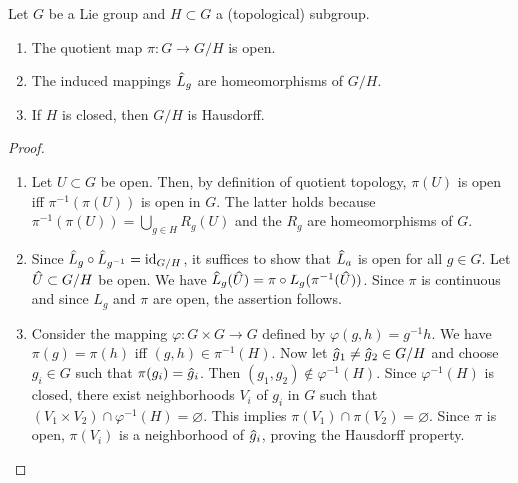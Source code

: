 \begin{lem}[{{\cite[Lem.~5.7.1]{RS1}}}]\label{lem 5.7.1 RS1}
    Let $G$ be a Lie group and $H\subset G$ a (topological) subgroup.
    \begin{enumerate}
        \item The quotient map $\pi:G\to G\slash H$ is open.
        \item The induced mappings $\wh{L}_g$ are homeomorphisms of $G\slash H$.
        \item If $H$ is closed, then $G\slash H$ is Hausdorff.
    \end{enumerate}
\end{lem}
\begin{proof}
    \begin{enumerate}
        \item Let $U\subset G$ be open. Then, by definition of quotient topology, $\pi(U)$ is open iff $\pi^{-1}(\pi(U))$ is open in $G$. The latter holds because $\pi^{-1}(\pi(U))=\bigcup_{g\in H}R_g(U)$ and the $R_g$ are homeomorphisms of $G$.
        \item Since $\wh{L}_g\circ \wh{L}_{g^{-1}}=\id_{G\slash H}$, it suffices to show that $\wh{L}_a$ is open for all $g\in G$. Let $\wh{U}\subset G\slash H$ be open. We have $\wh{L}_g(\wh{U})=\pi\circ L_g(\pi^{-1}(\wh{U}))$. Since $\pi$ is continuous and since $L_g$ and $\pi$ are open, the assertion follows.
        \item Consider the mapping $\varphi:G\times G\to G$  defined by $\varphi(g,h)=g^{-1}h$. We have $\pi(g)=\pi(h)$ iff $(g,h)\in\pi^{-1}(H)$. Now let $\wh{g}_1\neq \wh{g}_2\in G\slash H$ and choose $g_i\in G$ such that $\pi(g_i)=\wh{g}_i$. Then $(g_1,g_2)\notin \varphi^{-1}(H)$. Since $\varphi^{-1}(H)$ is closed, there exist neighborhoods $V_i$ of $g_i$ in $G$ such that $(V_1\times V_2)\cap \varphi^{-1}(H)=\varnothing$. This implies $\pi(V_1)\cap\pi(V_2)=\varnothing$. Since $\pi$ is open, $\pi(V_i)$ is a neighborhood of $\wh{g}_i$, proving the Hausdorff property.
    \end{enumerate}
\end{proof}


